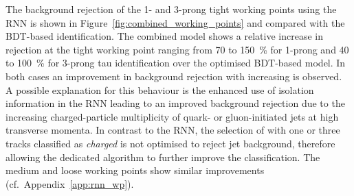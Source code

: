 The background rejection of the 1- and 3-prong tight working points using the
RNN is shown in Figure~\ref{fig:combined_working_points} and compared with the
BDT-based identification. The combined model shows a relative increase in
rejection at the tight working point ranging from \num{70} to \SI{150}{\percent}
for 1-prong and \num{40} to \SI{100}{\percent} for 3-prong tau identification
over the optimised BDT-based model. In both cases an improvement in background
rejection with increasing \tauhadvis \pt is observed. A possible explanation for
this behaviour is the enhanced use of isolation information in the RNN leading
to an improved background rejection due to the increasing charged-particle
multiplicity of quark- or gluon-initiated jets at high transverse momenta. In
contrast to the RNN, the selection of \tauhadvis with one or three tracks
classified as \emph{charged} is not optimised to reject jet background,
therefore allowing the dedicated algorithm to further improve the
classification. The medium and loose working points show similar improvements
(cf.\ Appendix~\ref{app:rnn_wp}).

